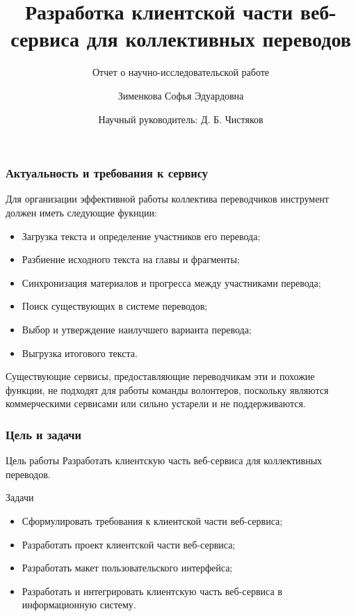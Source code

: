 \documentclass[hyperref={unicode}]{beamer}
\title[%
		Клиент веб-сервиса для коллективных переводов
]{%
		Разработка клиентской части веб-сервиса для коллективных переводов
}
\subtitle{Отчет о научно-исследовательской работе}
\author[%
		Зименкова Софья
]{%
		Зименкова Софья Эдуардовна
}
\date[%
		10.04.2024
]{%
		Научный руководитель: Д. Б. Чистяков
}
\institute[%
		ПетрГУ
]{%
		Петрозаводский государственный университет\\
		Кафедра Информатики и Математического Обеспечения
}
\begin{document}
\begin{frame}
\maketitle
\end{frame}


\begin{frame}
	\frametitle{Актуальность и требования к сервису}
	Для организации эффективной работы коллектива переводчиков инструмент должен иметь следующие фукнции:
 \begin{itemize}
		\item Загрузка текста и определение участников его перевода;
		\item Разбиение исходного текста на главы и фрагменты;
		\item Синхронизация материалов и прогресса между участниками перевода;
		\item Поиск существующих в системе переводов;
		\item Выбор и утверждение наилучшего варианта перевода;
		\item Выгрузка итогового текста.
	\end{itemize}
	Существующие сервисы, предоставляющие переводчикам эти и похожие функции, не подходят для работы команды волонтеров, поскольку являются коммерческими сервисами или сильно устарели и не поддерживаются.
\end{frame}


\begin{frame}
	\frametitle{Цель и задачи}
	\begin{block}{Цель работы}
		Разработать клиентскую часть веб-сервиса для коллективных переводов.
	\end{block}
	\begin{block}{Задачи}
	\begin{itemize}
		\item Сформулировать требования к клиентской части веб-сервиса;
		\item Разработать проект клиентской части веб-сервиса;
		\item Разработать макет пользовательского интерфейса;
		\item Разработать и интегрировать клиентскую часть веб-сервиса в информационную систему.
	\end{itemize}
	\end{block}
\end{frame}
\end{document}
